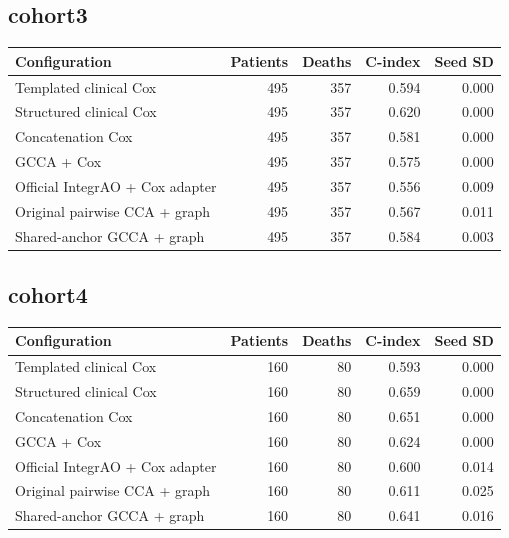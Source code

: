 \documentclass[10pt]{article}
\begin{document}
\subsection{cohort3}
\begin{center}
\footnotesize
\begin{tabular}{lrrrr}\hline
Configuration & Patients & Deaths & C-index & Seed SD\\\hline
Templated clinical Cox & 495 & 357 & 0.594 & 0.000\\
Structured clinical Cox & 495 & 357 & 0.620 & 0.000\\
Concatenation Cox & 495 & 357 & 0.581 & 0.000\\
GCCA + Cox & 495 & 357 & 0.575 & 0.000\\
Official IntegrAO + Cox adapter & 495 & 357 & 0.556 & 0.009\\
Original pairwise CCA + graph & 495 & 357 & 0.567 & 0.011\\
Shared-anchor GCCA + graph & 495 & 357 & 0.584 & 0.003\\
\hline\end{tabular}
\end{center}
\subsection{cohort4}
\begin{center}
\footnotesize
\begin{tabular}{lrrrr}\hline
Configuration & Patients & Deaths & C-index & Seed SD\\\hline
Templated clinical Cox & 160 & 80 & 0.593 & 0.000\\
Structured clinical Cox & 160 & 80 & 0.659 & 0.000\\
Concatenation Cox & 160 & 80 & 0.651 & 0.000\\
GCCA + Cox & 160 & 80 & 0.624 & 0.000\\
Official IntegrAO + Cox adapter & 160 & 80 & 0.600 & 0.014\\
Original pairwise CCA + graph & 160 & 80 & 0.611 & 0.025\\
Shared-anchor GCCA + graph & 160 & 80 & 0.641 & 0.016\\
\hline\end{tabular}
\end{center}
\end{document}

